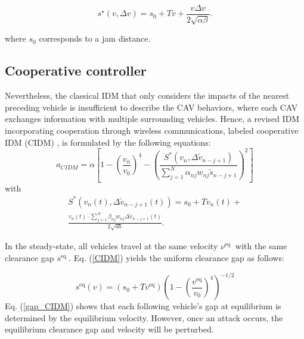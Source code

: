 \documentclass[letterpaper, 10pt, conference]{ieeeconf}  %
\def\eqref#1{(\ref{#1})}
\begin{document}
\begin{equation}
s^{\star}(v, \Delta v)=s_0+T v+\frac{v \Delta v}{2 \sqrt{\alpha \beta}}.    
\end{equation}

where $s_0$ corresponds to a jam distance. 

\subsection{Cooperative controller}
Nevertheless, the classical IDM that only considers the impacts of the nearest preceding vehicle is insufficient to describe the CAV
behaviors, where each CAV exchanges information with multiple surrounding vehicles. Hence, a revised IDM incorporating cooperation through wireless communications, labeled cooperative IDM (CIDM) \cite{C_IDM}, is formulated by the following equations:
\begin{equation}\label{CIDM}
a_{CIDM}=\alpha \left[1-\left(\frac{v_n}{v_0}\right)^4-\left(\frac{S^{*}\left(v_n, \Delta \tilde{v}_{n-j+1}\right)}{\sum_{j=1}^N \alpha_{n j} w_{n j} \tilde{{s}}_{n-j+1}}\right)^2\right] 
\end{equation}
with
\begin{equation*}
\begin{aligned}
    S^{*}\left(v_n(t), \Delta \widetilde{v}_{n-j+1}(t)\right)=s_0+T v_n(t)+ \\ \frac{v_n(t) \cdot \sum_{j=1}^N \beta_{n j} w_{n j} \Delta \tilde{v}_{n-j+1}(t)}{2 \sqrt{a b}} .
\end{aligned}
\end{equation*}

In the steady-state, all vehicles travel at the same velocity $\nu^{\text {eq }}$ with the same clearance gap $s^{\text {eq }}$. Eq. \eqref{CIDM} yields the uniform clearance gap as follows:

\begin{equation}\label{gap_CIDM}    
s^{\mathrm{eq}}(v)=\left(s_0+T v^{\mathrm{eq}}\right)\left(1-\left(\frac{v^{\mathrm{eq}}}{v_0}\right)^4\right)^{-1 / 2}
\end{equation}
Eq. \eqref{gap_CIDM} shows that each following vehicle's gap at equilibrium is determined by the equilibrium velocity. However, once an
attack occurs, the equilibrium clearance gap and velocity will be perturbed.
\end{document}
